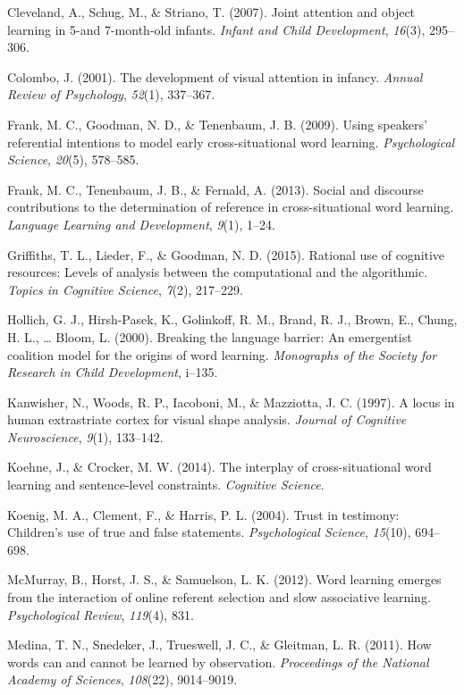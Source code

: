 \documentclass[authoryear, review]{elsarticle}
\begin{document}
Cleveland, A., Schug, M., \& Striano, T. (2007). Joint attention and
object learning in 5-and 7-month-old infants. \emph{Infant and Child
Development}, \emph{16}(3), 295--306.

Colombo, J. (2001). The development of visual attention in infancy.
\emph{Annual Review of Psychology}, \emph{52}(1), 337--367.

Frank, M. C., Goodman, N. D., \& Tenenbaum, J. B. (2009). Using
speakers' referential intentions to model early cross-situational word
learning. \emph{Psychological Science}, \emph{20}(5), 578--585.

Frank, M. C., Tenenbaum, J. B., \& Fernald, A. (2013). Social and
discourse contributions to the determination of reference in
cross-situational word learning. \emph{Language Learning and
Development}, \emph{9}(1), 1--24.

Griffiths, T. L., Lieder, F., \& Goodman, N. D. (2015). Rational use of
cognitive resources: Levels of analysis between the computational and
the algorithmic. \emph{Topics in Cognitive Science}, \emph{7}(2),
217--229.

Hollich, G. J., Hirsh-Pasek, K., Golinkoff, R. M., Brand, R. J., Brown,
E., Chung, H. L., \ldots{} Bloom, L. (2000). Breaking the language
barrier: An emergentist coalition model for the origins of word
learning. \emph{Monographs of the Society for Research in Child
Development}, i--135.

Kanwisher, N., Woods, R. P., Iacoboni, M., \& Mazziotta, J. C. (1997). A
locus in human extrastriate cortex for visual shape analysis.
\emph{Journal of Cognitive Neuroscience}, \emph{9}(1), 133--142.

Koehne, J., \& Crocker, M. W. (2014). The interplay of cross-situational
word learning and sentence-level constraints. \emph{Cognitive Science}.

Koenig, M. A., Clement, F., \& Harris, P. L. (2004). Trust in testimony:
Children's use of true and false statements. \emph{Psychological
Science}, \emph{15}(10), 694--698.

McMurray, B., Horst, J. S., \& Samuelson, L. K. (2012). Word learning
emerges from the interaction of online referent selection and slow
associative learning. \emph{Psychological Review}, \emph{119}(4), 831.

Medina, T. N., Snedeker, J., Trueswell, J. C., \& Gleitman, L. R.
(2011). How words can and cannot be learned by observation.
\emph{Proceedings of the National Academy of Sciences}, \emph{108}(22),
9014--9019.
\end{document}
